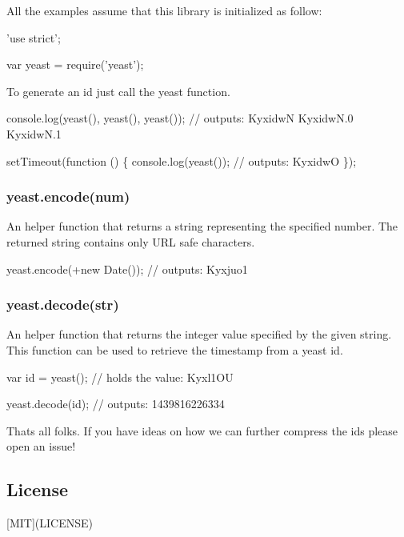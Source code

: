 All the examples assume that this library is initialized as follow\+:


\begin{DoxyCode}
'use strict';

var yeast = require('yeast');
\end{DoxyCode}


To generate an id just call the {\ttfamily yeast} function.


\begin{DoxyCode}
console.log(yeast(), yeast(), yeast()); // outputs: KyxidwN KyxidwN.0 KyxidwN.1

setTimeout(function () \{
  console.log(yeast()); // outputs: KyxidwO
\});
\end{DoxyCode}


\subsubsection*{yeast.\+encode(num)}

An helper function that returns a string representing the specified number. The returned string contains only U\+RL safe characters.


\begin{DoxyCode}
yeast.encode(+new Date()); // outputs: Kyxjuo1
\end{DoxyCode}


\subsubsection*{yeast.\+decode(str)}

An helper function that returns the integer value specified by the given string. This function can be used to retrieve the timestamp from a {\ttfamily yeast} id.


\begin{DoxyCode}
var id = yeast(); // holds the value: Kyxl1OU

yeast.decode(id); // outputs: 1439816226334
\end{DoxyCode}


That\textquotesingle{}s all folks. If you have ideas on how we can further compress the ids please open an issue!

\subsection*{License}

\mbox{[}M\+IT\mbox{]}(L\+I\+C\+E\+N\+SE) 